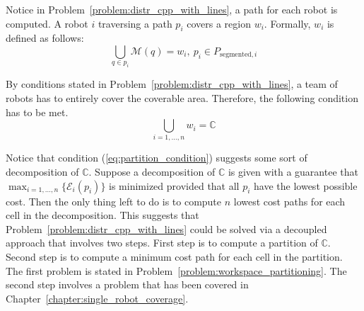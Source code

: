 \documentclass[../main.tex]{subfiles}
\begin{document}
Notice in Problem~\ref{problem:distr_cpp_with_lines}, a path for each robot is computed. A robot $i$ traversing a path $p_i$ covers a region $w_i$. Formally, $w_i$ is defined as follows:
\begin{equation}
	\bigcup_{q\in p_i}\mathcal{M}(q) = w_i,\ p_i\in P_{\text{segmented},i}
\end{equation}

By conditions stated in Problem~\ref{problem:distr_cpp_with_lines}, a team of robots has to entirely cover the coverable area. Therefore, the following condition has to be met.
\begin{equation}
	\label{eq:partition_condition}
	\bigcup_{i=1,\ldots,n}w_i=\mathbb{C}
\end{equation}

Notice that condition (\ref{eq:partition_condition}) suggests some sort of decomposition of $\mathbb{C}$. Suppose a decomposition of $\mathbb{C}$ is given with a guarantee that $\max_{i=1,\ldots,n}\{\mathcal{E}_i(p_i)\}$ is minimized provided that all $p_i$ have the lowest possible cost. Then the only thing left to do is to compute $n$ lowest cost paths for each cell in the decomposition. This suggests that Problem~\ref{problem:distr_cpp_with_lines} could be solved via a decoupled approach that involves two steps. First step is to compute a partition of $\mathbb{C}$. Second step is to compute a minimum cost path for each cell in the partition. The first problem is stated in Problem~\ref{problem:workspace_partitioning}. The second step involves a problem that has been covered in Chapter~\ref{chapter:single_robot_coverage}.
\end{document}
